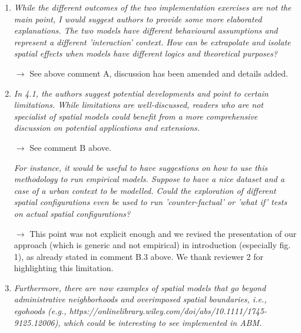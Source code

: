 \documentclass[11pt,a4paper,sans]{moderncv}        %
\begin{document}
\medskip


\begin{enumerate}

  \item \textit{While the different outcomes of the two implementation exercises are not the main point, I would suggest authors to provide some more elaborated explanations. The two models have different behavioural assumptions and represent a different 'interaction' context. How can be extrapolate and isolate spatial effects when models have different logics and theoretical purposes?}
  
  $\rightarrow$ See above comment A, discussion has been amended and details added.
  \medskip

  \item \textit{In 4.1, the authors suggest potential developments and point to certain limitations. While limitations are well-discussed, readers who are not specialist of spatial models could benefit from a more comprehensive discussion on potential applications and extensions.}
  
  $\rightarrow$ See comment B above.
  
  \medskip
  
  \textit{For instance, it would be useful to have suggestions on how to use this methodology to run empirical models. Suppose to have a nice dataset and a case of a urban context to be modelled. Could the exploration of different spatial configurations even be used to run 'counter-factual' or 'what if' tests on actual spatial configurations?}
  
  $\rightarrow$ This point was not explicit enough and we revised the presentation of our approach (which is generic and not empirical) in introduction (especially fig. 1), as already stated in comment B.3 above. We thank reviewer 2 for highlighting this limitation.
  

  \medskip

  \item \textit{Furthermore, there are now examples of spatial models that go beyond administrative neighborhoods and overimposed spatial boundaries, i.e., egohoods (e.g., https://onlinelibrary.wiley.com/doi/abs/10.1111/1745-9125.12006), which could be interesting to see implemented in ABM.}
  

\end{enumerate}
\end{document}
